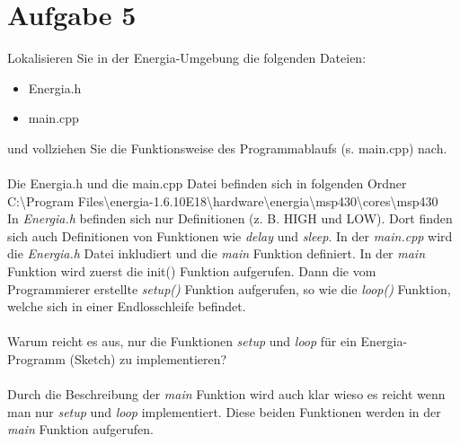 \section{Aufgabe 5}
Lokalisieren Sie in der Energia-Umgebung die folgenden Dateien:
\begin{itemize}
	\item Energia.h
	\item main.cpp
\end{itemize}
und vollziehen Sie die Funktionsweise des Programmablaufs (s. main.cpp) nach.\\ \\
Die Energia.h und die main.cpp Datei befinden sich in folgenden Ordner\\
C:\textbackslash Program Files\textbackslash energia-1.6.10E18\textbackslash hardware\textbackslash energia\textbackslash msp430\textbackslash cores\textbackslash msp430\\
In \textit{Energia.h} befinden sich nur Definitionen (z. B. HIGH und LOW). Dort finden sich auch Definitionen von Funktionen wie \textit{delay} und \textit{sleep}. In der \textit{main.cpp} wird die \textit{Energia.h} Datei inkludiert und die \textit{main} Funktion definiert. In der \textit{main} Funktion wird zuerst die init() Funktion aufgerufen. Dann die vom Programmierer erstellte \textit{setup()} Funktion aufgerufen, so wie die \textit{loop()} Funktion, welche sich in einer Endlosschleife befindet.\\ \\
Warum reicht es aus, nur die Funktionen \textit{setup} und \textit{loop} für ein Energia-Programm (Sketch) zu implementieren?\\ \\
Durch die Beschreibung der \textit{main} Funktion wird auch klar wieso es reicht wenn man nur \textit{setup} und \textit{loop} implementiert. Diese beiden Funktionen werden in der \textit{main} Funktion aufgerufen.
